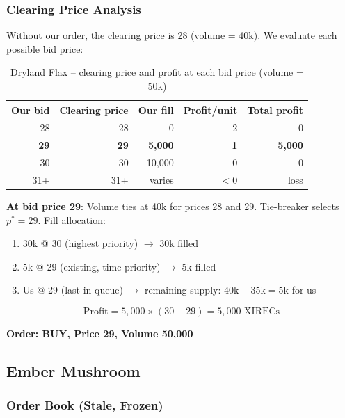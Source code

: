 \documentclass[11pt,a4paper]{article}
\begin{document}
\subsubsection{Clearing Price Analysis}

Without our order, the clearing price is 28 (volume = 40k). We evaluate each possible bid price:

\begin{table}[H]
\centering
\caption{Dryland Flax -- clearing price and profit at each bid price (volume = 50k)}
\begin{tabular}{@{}rrrrr@{}}
\toprule
\textbf{Our bid} & \textbf{Clearing price} & \textbf{Our fill} & \textbf{Profit/unit} & \textbf{Total profit} \\
\midrule
28 & 28 & 0     & 2    & 0 \\
\textbf{29} & \textbf{29} & \textbf{5,000}  & \textbf{1}    & \textbf{5,000} \\
30 & 30 & 10,000 & 0    & 0 \\
31+ & 31+ & varies & $<0$ & loss \\
\bottomrule
\end{tabular}
\end{table}

\textbf{At bid price 29}: Volume ties at 40k for prices 28 and 29. Tie-breaker selects $p^* = 29$. Fill allocation:
\begin{enumerate}
    \item 30k @ 30 (highest priority) $\rightarrow$ 30k filled
    \item 5k @ 29 (existing, time priority) $\rightarrow$ 5k filled
    \item Us @ 29 (last in queue) $\rightarrow$ remaining supply: $40\text{k} - 35\text{k} = 5\text{k}$ for us
\end{enumerate}

\begin{equation}
\text{Profit} = 5{,}000 \times (30 - 29) = \boxed{5{,}000 \text{ XIRECs}}
\end{equation}

\textbf{Order: BUY, Price 29, Volume 50,000}

\subsection{Ember Mushroom}

\subsubsection{Order Book (Stale, Frozen)}
\end{document}
